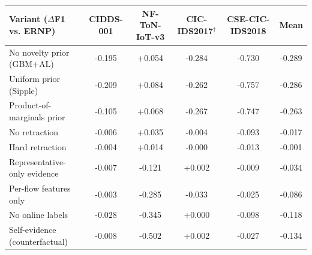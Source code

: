 \begin{tabular}{lccccc}
\toprule
Variant ($\Delta$F1 vs. ERNP) & CIDDS-001 & NF-ToN-IoT-v3 & CIC-IDS2017$^\dagger$ & CSE-CIC-IDS2018 & Mean\\
\midrule
No novelty prior (GBM+AL) & -0.195 & +0.054 & -0.284 & -0.730 & -0.289\\
Uniform prior (Sipple) & -0.209 & +0.084 & -0.262 & -0.757 & -0.286\\
Product-of-marginals prior & -0.105 & +0.068 & -0.267 & -0.747 & -0.263\\
No retraction & -0.006 & +0.035 & -0.004 & -0.093 & -0.017\\
Hard retraction & -0.004 & +0.014 & -0.000 & -0.013 & -0.001\\
Representative-only evidence & -0.007 & -0.121 & +0.002 & -0.009 & -0.034\\
Per-flow features only & -0.003 & -0.285 & -0.033 & -0.025 & -0.086\\
No online labels & -0.028 & -0.345 & +0.000 & -0.098 & -0.118\\
Self-evidence (counterfactual) & -0.008 & -0.502 & +0.002 & -0.027 & -0.134\\
\bottomrule
\end{tabular}
